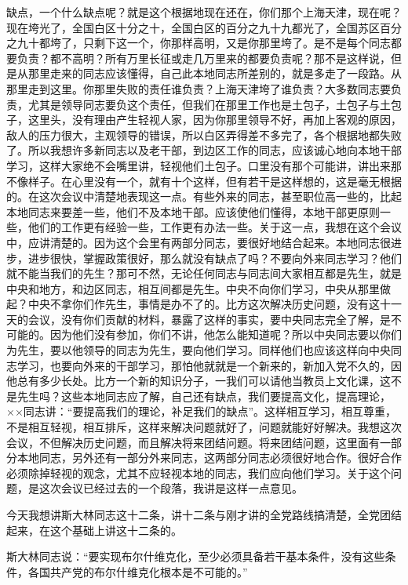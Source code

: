 缺点，一个什么缺点呢？就是这个根据地现在还在，你们那个上海天津，现在呢？现在垮光了，全国白区十分之十，全国白区的百分之九十九都光了，全国苏区百分之九十都垮了，只剩下这一个，你那样高明，又是你那里垮了。是不是每个同志都要负责？都不高明？所有万里长征或走几万里来的都要负责呢？那不是这样说，但是从那里走来的同志应该懂得，自己此本地同志所差别的，就是多走了一段路。从那里走到这里。你那里失败的责任谁负责？上海天津垮了谁负责？大多数同志要负责，尤其是领导同志要负这个责任，但我们在那里工作也是土包子，土包子与土包子，这里头，没有理由产生轻视人家，因为你那里领导不好，再加上客观的原因，敌人的压力很大，主观领导的错误，所以白区弄得差不多完了，各个根据地都失败了。所以我想许多新同志以及老干部，到边区工作的同志，应该诚心地向本地干部学习，这样大家绝不会嘴里讲，轻视他们土包子。口里没有那个可能讲，讲出来那不像样子。在心里没有一个，就有十个这样，但有若干是这样想的，这是毫无根据的。在这次会议中清楚地表现这一点。有些外来的同志，甚至职位高一些的，比起本地同志来要差一些，他们不及本地干部。应该使他们懂得，本地干部更原则一些，他们的工作更有经验一些，工作更有办法一些。关于这一点，我想在这个会议中，应讲清楚的。因为这个会里有两部分同志，要很好地结合起来。本地同志很进步，进步很快，掌握政策很好，那么就没有缺点了吗？不要向外来同志学习？他们就不能当我们的先生？那可不然，无论任何同志与同志间大家相互都是先生，就是中央和地方，和边区同志，相互间都是先生。中央不向你们学习，中央从那里做起？中央不拿你们作先生，事情是办不了的。比方这次解决历史问题，没有这十一天的会议，没有你们贡献的材料，暴露了这样的事实，要中央同志完全了解，是不可能的。因为他们没有参加，你们不讲，他怎么能知道呢？所以中央同志要以你们为先生，要以他领导的同志为先生，要向他们学习。同样他们也应该这样向中央同志学习，也要向外来的干部学习，那怕他就就是一个新来的，新加入党不久的，因他总有多少长处。比方一个新的知识分子，一我们可以请他当教员上文化课，这不是先生吗？这些本地同志应了解，自己还有缺点，我们要提高文化，提高理论，××同志讲：“要提高我们的理论，补足我们的缺点”。这样相互学习，相互尊重，不是相互轻视，相互排斥，这样来解决问题就好了，问题就能好好解决。我想这次会议，不但解决历史问题，而且解决将来团结问题。将来团结问题，这里面有一部分本地同志，另外还有一部分外来同志，这两部分同志必须很好地合作。很好合作必须除掉轻视的观念，尤其不应轻视本地的同志，我们应向他们学习。关于这个问题，是这次会议已经过去的一个段落，我讲是这样一点意见。


今天我想讲斯大林同志这十二条，讲十二条与刚才讲的全党路线搞清楚，全党团结起来，在这个基础上讲这十二条的。

斯大林同志说：“要实现布尔什维克化，至少必须具备若干基本条件，没有这些条件，各国共产党的布尔什维克化根本是不可能的。”

